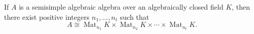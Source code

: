 If $A$ is a semisimple algebraic algebra over an algebraically closed field $K$, then there exist positive integers $n_1, \ldots, n_t$ such that
$$A \cong \operatorname{Mat}_{n_1} K \times \operatorname{Mat}_{n_2} K \times \cdots \times \operatorname{Mat}_{n_t} K.$$

